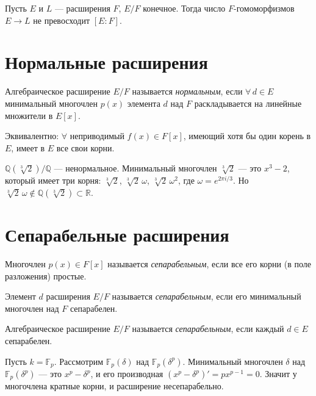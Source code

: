 \begin{cor}
    Пусть $E$ и $L$ --- расширения $F$, $E/F$ конечное. Тогда число $F$-гомоморфизмов $E \to L$ не превосходит
    $[E : F]$.
\end{cor}


\section{Нормальные расширения}

\begin{definition}
    Алгебраическое расширение $E/F$ называется \emph{нормальным}, если $\forall\, d \in E$ минимальный многочлен
    $p(x)$ элемента $d$ над $F$ раскладывается на линейные множители в $E[x]$.

    Эквивалентно: $\forall$ неприводимый $f(x) \in F[x]$, имеющий хотя бы один корень в $E$, имеет в
    $E$ все свои корни.
\end{definition}


\begin{example}
    $\mathbb{Q}(\sqrt[3]{2}) / \mathbb{Q}$ --- ненормальное. Минимальный многочлен $\sqrt[3]{2}$ --- это
    $x^3 - 2$, который имеет три корня: $\sqrt[3]{2}$, $\sqrt[3]{2}\,\omega$, $\sqrt[3]{2}\,\omega^2$,
    где $\omega = e^{2\pi i/3}$. Но $\sqrt[3]{2}\,\omega \notin \mathbb{Q}(\sqrt[3]{2}) \subset \mathbb{R}
    $.
\end{example}


\section{Сепарабельные расширения}

\begin{definition}
    Многочлен $p(x) \in F[x]$ называется \emph{сепарабельным}, если все его корни (в поле разложения)
    простые.

    Элемент $d$ расширения $E/F$ называется \emph{сепарабельным}, если его минимальный многочлен над
    $F$ сепарабелен.

    Алгебраическое расширение $E/F$ называется \emph{сепарабельным}, если каждый $d \in E$ сепарабелен.

\end{definition}


\begin{example}
    Пусть $k = \mathbb{F}_p$. Рассмотрим $\mathbb{F}_p(\delta)$ над $\mathbb{F}_p(\delta^p)$. Минимальный многочлен
    $\delta$ над $\mathbb{F}_p(\delta^p)$ --- это $x^p - \delta^p$, и его производная $(x^p - \delta^p)
    ' = p x^{p-1} = 0$. Значит у многочлена кратные корни, и расширение несепарабельно.
\end{example}


